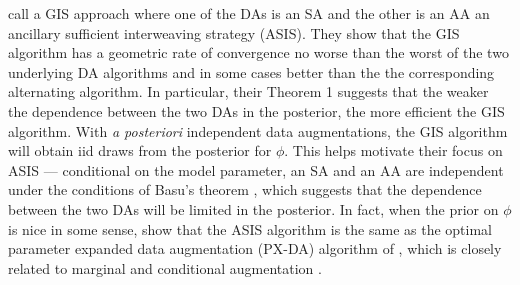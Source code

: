 \documentclass[12pt]{article}
\newcommand{\jarad}[1]{{\color{red} Jarad: #1}}
\begin{document}
\citet{yu2011center} call a GIS approach where one of the DAs is an SA and the other is an AA an ancillary sufficient interweaving strategy (ASIS).
They show that the GIS algorithm has a geometric rate of convergence no worse than the worst of the two underlying DA algorithms and in some cases better than the the corresponding alternating algorithm. 
In particular, their Theorem 1 suggests that the weaker the dependence between the two DAs in the posterior, the more efficient the GIS algorithm. 
With \emph{a posteriori} independent data augmentations, the GIS algorithm will obtain iid draws from the posterior for $\phi$. 
This helps motivate their focus on ASIS --- conditional on the model parameter, an SA and an AA are independent under the conditions of Basu's theorem \cite{basu1955statistics}, which suggests that the dependence between the two DAs will be limited in the posterior. 
In fact, when the prior on $\phi$ is nice in some sense, \citet{yu2011center} show that the ASIS algorithm is the same as the optimal parameter expanded data augmentation (PX-DA) algorithm of \citet{liu1999parameter}, which is closely related to marginal and conditional augmentation \cite{meng1999seeking,hobert2008theoretical}.

\end{document}
